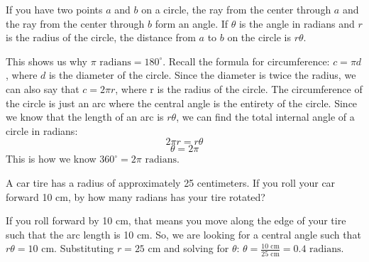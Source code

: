 \begin{mdframed}[style=important, frametitle={Length of an Arc}]

If you have two points $a$ and $b$ on a circle, the ray from the
center through $a$ and the ray from the center through $b$ form an
angle.  If $\theta$ is the angle in radians and $r$ is the radius of
the circle, the distance from $a$ to $b$ on the circle is $r \theta$.

\begin{center}
\end{center}


\end{mdframed}

This shows us why $\pi\text{ radians} = 180^\circ$. Recall the formula for 
circumference: $c = \pi d$, where $d$ is the diameter of the circle. Since the 
diameter is twice the radius, we can also say that $c = 2\pi r$, where r 
is the radius of the circle. The circumference of the circle is just an arc 
where the central angle is the entirety of the circle. Since we know that the 
length of an arc is $r \theta$, we can find the total internal angle of a 
circle in radians:
$$2 \pi r = r \theta$$
$$\theta = 2\pi$$
This is how we know $360^\circ = 2\pi\text{ radians}$. 

\begin{Exercise}[title = {Angle of Rotation}, label = radian1]
A car tire has a radius of approximately 25 centimeters. If you roll your car 
forward 10 cm, by how many radians has your tire rotated?
\end{Exercise}

\begin{Answer}[ref = radian1]
If you roll forward by 10 cm, that means you move along the edge of your tire 
such that the arc length is 10 cm. So, we are looking for a central angle such 
that $r \theta = 10 \text{ cm}$. Substituting $r = 25 \text{ cm}$ and solving 
for $\theta$: $\theta = \frac{10\text{ cm}}{25\text{ cm}} = 0.4\text{ radians}$. 
\end{Answer}

